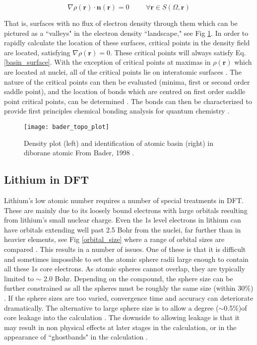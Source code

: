 \begin{equation}
\nabla \rho(\textbf{r}) \cdot \textbf{n}(\textbf{r}) = 0   \hspace{1cm} \forall\textbf{r} \in S(\Omega,\textbf{r})
\label{basin_surface}
\end{equation}

That is, surfaces with no flux of electron density through them which can be pictured as a ``valleys" in the electron density ``landscape," see Fig \ref{topo_plot}. In order to  rapidly calculate the location of these surfaces, critical points in the density field are located, satisfying $\nabla \rho(\textbf{r})=0$.  These critical points will always satisfy Eq. \ref{basin_surface}.  With the exception of critical points at maximas in $\rho(\textbf{r})$ which are located at nuclei, all of the critical points lie on interatomic surfaces \cite{critic2}. The nature of the critical points can then be evaluated (minima, first or second order saddle point), and the location of bonds which are centred on first order saddle point critical points, can be determined \cite{critic2}.  The bonds can then be characterized to provide first principles chemical bonding analysis for quantum chemistry \cite{fugel_variety_2018}.  

\begin{figure}
	\centering
	\texttt{[image: bader\_topo\_plot]}
	\caption{Density plot (left) and identification of atomic basin (right) in diborane atomic From Bader, 1998 \cite{bader}.}
	\label{topo_plot}
\end{figure}


\subsection{Lithium in DFT}
Lithium's low atomic number requires a number of special treatments  in DFT.  These are mainly due to its loosely bound electrons with large orbitals resulting from lithium's small nuclear charge.  Even the 1s level electrons in lithium can have orbitals extending well past 2.5 Bohr from the nuclei, far further than in heavier elements, see Fig \ref{orbital_size} where a range of orbital sizes are compared \cite{mauchamp_ab_2006}.  This results in a number of issues. One of these is that it is difficult and sometimes impossible to set the atomic sphere radii large enough to contain all these 1s core electrons.  As atomic spheres cannot overlap, they are typically limited to $\sim$ 2.0 Bohr. Depending on the compound, the sphere size can be further constrained as all the spheres must be roughly the same size (within 30\%) \cite{wien2k}.  If the sphere sizes are too varied, convergence time and accuracy can deteriorate dramatically.  The alternative to large sphere size is to allow a degree ($\sim$0.5\%)of core leakage into the calculation \cite{wien2k}.  The downside to allowing leakage is that it may result in non physical effects at later stages in the calculation, or in the appearance of ``ghostbands" in the calculation \cite{wien2k}.


